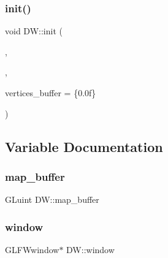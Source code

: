 \subsubsection{\texorpdfstring{init()}{init()}}
{\footnotesize\ttfamily void D\+W\+::init (\begin{DoxyParamCaption}\item[{x}]{,  }\item[{y}]{,  }\item[{G\+Lfloat $\ast$}]{vertices\+\_\+buffer = {\ttfamily \{0.0f\}} }\end{DoxyParamCaption})}



\subsection{Variable Documentation}
\mbox{\label{namespace_d_w_a888297366f850dc6344c0d54c57550c7}} 
\subsubsection{\texorpdfstring{map\_buffer}{map\_buffer}}
{\footnotesize\ttfamily G\+Luint D\+W\+::map\+\_\+buffer}

\mbox{\label{namespace_d_w_aab8c3528b21e62a229edce918c005236}} 
\subsubsection{\texorpdfstring{window}{window}}
{\footnotesize\ttfamily G\+L\+F\+Wwindow$\ast$ D\+W\+::window}

